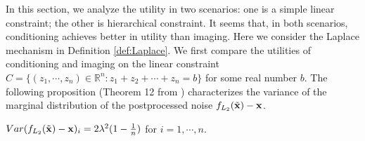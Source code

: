 \documentclass[11pt]{article}
\begin{document}

In this section,  we analyze the utility in two scenarios: one is a simple linear constraint; the other is hierarchical constraint.  It seems that, in both scenarios, conditioning achieves better in utility than imaging.  Here we consider the Laplace mechanism in Definition \ref{def:Laplace}. We first compare the utilities of conditioning and imaging on the linear constraint $C=\{(z_1, \cdots, z_n)\in \mathbb{R}^n: z_1+z_2+ \cdots + z_n =b\}$ for some real number $b$.  The following proposition (Theorem 12 from \cite{Zhu2021bias}) characterizes the variance of the marginal distribution of the postprocessed noise $f_{L_2}(\tilde{\bold{x}}) - \bold{x}$. 

\begin{proposition} \label{prop:variance-imaging} $Var (f_{L_2}(\tilde{\bold{x}})-\bold{x})_i= 2\lambda^2 (1-\frac{1}{n})$ for $i=1, \cdots, n$.
\end{proposition}
\end{document}
